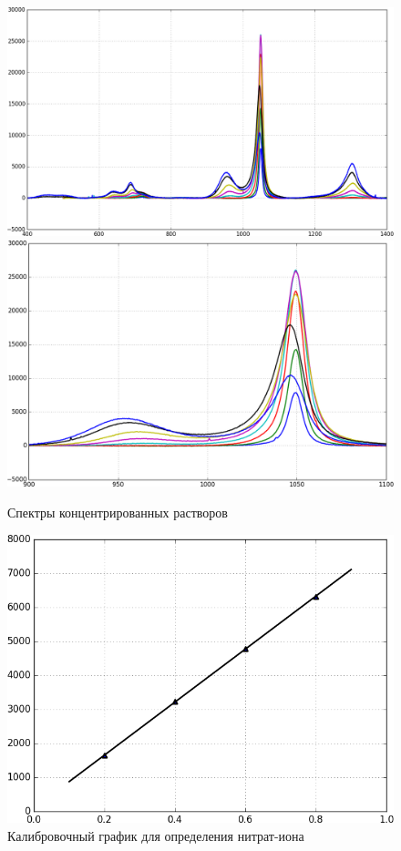 \documentclass[13pt]{extarticle}
\begin{document}
\begin{figure}[!ht]
	\centering
	\includegraphics[scale=0.3]{../concentrated1.png}
	\hspace{0.5cm}
	\includegraphics[scale=0.3]{../concentrated2.png}
	\caption{Спектры концентрированных растворов}
\end{figure}

\begin{figure}[!ht]
	\centering
	\includegraphics[scale=0.5]{../regr.png}
	\caption{Калибровочный график для определения нитрат-иона}
\end{figure}
\end{document}
